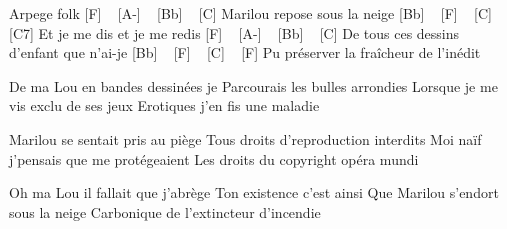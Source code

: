 Arpege folk
[F] ~ [A-] ~ [Bb] ~ [C] 
Marilou repose sous la neige
[Bb] ~ [F] ~ [C] ~ [C7] 
Et je me dis et je me redis
[F] ~ [A-] ~ [Bb] ~ [C] 
De tous ces dessins d'enfant que n'ai-je
[Bb] ~ [F] ~ [C] ~ [F]
Pu préserver la fraîcheur de l'inédit

De ma Lou en bandes dessinées je
Parcourais les bulles arrondies
Lorsque je me vis exclu de ses jeux
Erotiques j'en fis une maladie

Marilou se sentait pris au piège
Tous droits d'reproduction interdits
Moi naïf j'pensais que me protégeaient
Les droits du copyright opéra mundi

Oh ma Lou il fallait que j'abrège
Ton existence c'est ainsi
Que Marilou s'endort sous la neige
Carbonique de l'extincteur d'incendie 